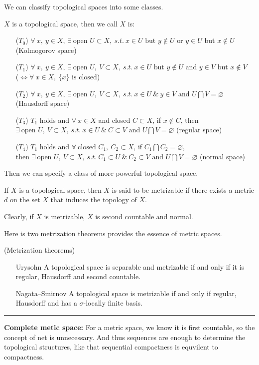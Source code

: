 \documentclass[a4paper,11pt]{report}
\begin{document}
We can classify topological spaces into some classes.
\begin{defn}
$X$ is a topological space, then we call $X$ is:
\begin{enumerate}
	\item [($T_0$)] $\forall ~ x,~y \in X,~ \exists ~ \text{open } U \subset X,~ s.t.~ x \in U \text{ but } y \notin U \text{ or } y \in U \text{ but } x \notin U$ (Kolmogorov space)
	\item [($T_1$)] $\forall ~ x,~y \in X,~ \exists ~ \text{open } U,~ V \subset X, ~s.t.~ x \in U \text{ but } y \notin U \text{ and } y \in V \text{ but } x \notin V$\\
	($\Leftrightarrow \forall~ x \in X,~ \{x\} \text{ is closed} $)
	\item [($T_2$)] $\forall ~ x,~y \in X,~ \exists ~ \text{open } U,~ V \subset X, ~s.t.~ x \in U ~\&~ y \in V \text { and } U \bigcap V = \varnothing$ (Hausdorff space)
	\item [($T_3$)] $T_1$ holds and $\forall ~ x \in X$ and closed $C \subset X$, if $x \notin C$, then $\exists ~ \text{open } U,~ V \subset X, ~s.t.~ x \in U ~\&~ C \subset V \text{ and } U \bigcap V = \varnothing$ (regular space)
	\item [($T_4$)] $T_1$ holds and $\forall ~ \text{closed } C_1,~ C_2 \subset X$, if $C_1 \bigcap C_2 = \varnothing$, \\ then $\exists ~ \text{open } U,~ V \subset X, ~s.t.~ C_1 \subset U ~\&~ C_2 \subset V \text{ and } U \bigcap V = \varnothing$ (normal space)
\end{enumerate}
\end{defn}

Then we can specify a class of more powerful topological space.
\begin{defn}
	If $X$ is a topological space, then $X$ is said to be metrizable if there exists a metric $d$ on the set $X$ that induces the topology of $X$.
\end{defn}
\begin{rem}
	Clearly, if $X$ is metrizable, $X$ is second countable and normal.
\end{rem}

Here is two metrization theorems provides the essence of metric spaces.
\begin{thm}
(Metrization theorems)
	\begin{enumerate}
		\item[Urysohn] A topological space is separable and metrizable if and only if it is regular, Hausdorff and second countable.
		\item[Nagata–Smirnov] A topological space is metrizable if and only if regular, Hausdorff and has a $\sigma$-locally finite basis.
	\end{enumerate}
\end{thm}
\vspace{0.2in}
\rule{1mm}{1mm} \textbf{Complete metic space:} For a metric space, we know it is first countable, so the concept of net is unnecessary. And thus sequences are enough to determine the topological structures, like that sequential compactness is equvilent to compactness. 
\end{document}
